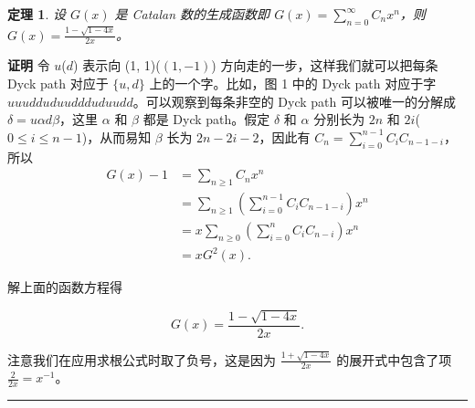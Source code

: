 \documentclass[a4paper,11pt]{article}
\newtheorem{thm}{定理}[section]
\def\qed{\nopagebreak\hfill{\rule{4pt}{7pt}}\medbreak}
\begin{document}
\begin{thm}
设 $G(x)$ 是 Catalan 数的生成函数即
$G(x)=\sum\limits_{n=0}^{\infty}C_nx^n$，则
$G(x)=\frac{1-\sqrt{1-4x}}{2x}$。
\end{thm}
{\bf{证明}} 令 $u$($d$) 表示向 (1, 1)($(1,-1)$)
方向走的一步，这样我们就可以把每条 Dyck path 对应于 $\{u, d\}$
上的一个字。比如，图 1 中的 Dyck path 对应于字
$uuudduduuddduduudd$。可以观察到每条非空的 Dyck path
可以被唯一的分解成 $\delta=u\alpha d\beta$，这里 $\alpha$ 和 $\beta$
都是 Dyck path。假定 $\delta$ 和 $\alpha$ 分别长为 $2n$ 和
$2i$($0\le i\le n-1$)，从而易知 $\beta$ 长为 $2n-2i-2$，因此有
$C_n=\sum\limits_{i=0}^{n-1}C_iC_{n-1-i}$，所以
\begin{align*}
G(x)-1%
&=\sum_{n\ge1}C_nx^n\\
&=\sum_{n\ge1}\left(\sum_{i=0}^{n-1}C_iC_{n-1-i}\right)x^n\\%
&=x\sum_{n\ge0}\left(\sum_{i=0}^{n}C_iC_{n-i}\right)x^{n}\\
&=xG^2(x).%
\end{align*}

解上面的函数方程得

\[
G(x)=\frac{1-\sqrt{1-4x}}{2x}.
\]

注意我们在应用求根公式时取了负号，这是因为
$\frac{1+\sqrt{1-4x}}{2x}$ 的展开式中包含了项
$\frac{2}{2x}=x^{-1}$。\qed
\end{document}
